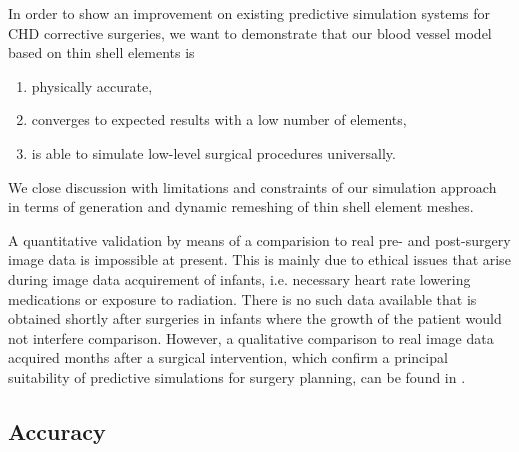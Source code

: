 In order to show an improvement on existing predictive simulation systems for CHD corrective surgeries, we want to demonstrate that our blood vessel model based on thin shell elements is
\begin{enumerate}
\item physically accurate,
\item converges to expected results with a low number of elements,
\item is able to simulate low-level surgical procedures universally.
\end{enumerate}
We close discussion with limitations and constraints of our simulation approach in terms of generation and dynamic remeshing of thin shell element meshes.

A quantitative validation by means of a comparision to real pre- and post-surgery image data is impossible at present. This is mainly due to ethical issues that arise during image data acquirement of infants, i.e. necessary heart rate lowering medications or exposure to radiation. There is no such data available that is obtained shortly after surgeries in infants where the growth of the patient would not interfere comparison. However, a qualitative comparison to real image data acquired months after a surgical intervention, which confirm a principal suitability of predictive simulations for surgery planning, can be found in \cite{Li2009}.

\subsection{Accuracy}

